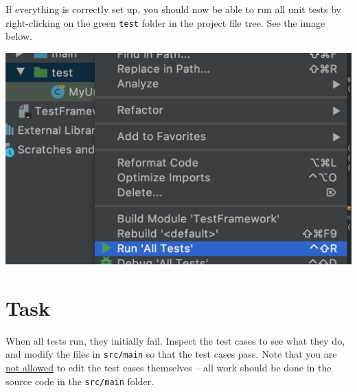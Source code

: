 \documentclass[a4paper, english]{article}
\begin{document}
        If everything is correctly set up, you should now be able to run all unit tests by right-clicking on the green \texttt{test} folder in the project file tree. See the image below.

        \includegraphics[width=\textwidth]{run-tests.png}

    \section{Task}
        When all tests run, they initially fail. Inspect the test cases to see what they do, and modify the files in \texttt{src/main} so that the test cases pass. Note that you are \underline{not allowed} to edit the test cases themselves -- all work should be done in the source code in the \texttt{src/main} folder.
\end{document}
